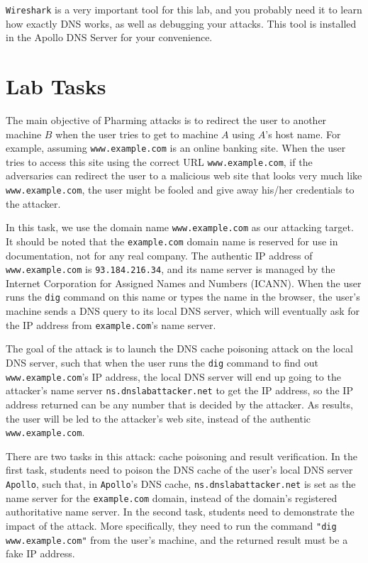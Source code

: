 {\tt Wireshark} is a very important tool for this lab, and you 
probably need it to learn how exactly DNS works, as well as 
debugging your attacks.  This tool is installed in the Apollo 
DNS Server for your convenience.


\section{Lab Tasks}


The main objective of Pharming attacks is to redirect the user
to another machine $B$ when the user tries to get to machine $A$ using
$A$'s host name. For example, assuming {\tt www.example.com} is an online banking 
site.  When the user tries to access this site using the
correct URL {\tt www.example.com}, if the adversaries can redirect the user 
to a malicious web site that looks very much like 
{\tt www.example.com}, the user might be fooled and give away 
his/her credentials to the attacker. 

In this task, we use the domain name {\tt www.example.com}
as our attacking target. It should be noted that the {\tt example.com} 
domain name is reserved for use in documentation, not for 
any real company. The authentic IP address of {\tt www.example.com} is 
{\tt 93.184.216.34}, and its name server is managed by
the Internet Corporation for Assigned Names and Numbers (ICANN).
When the user runs the {\tt dig} command 
on this name or types the name in the browser, 
the user's machine sends a DNS query to its local DNS 
server, which will eventually ask for the IP address 
from {\tt example.com}'s name server. 


The goal of the attack is to launch the DNS cache poisoning attack
on the local DNS server, such that 
when the user runs the {\tt dig} command to find out {\tt
www.example.com}'s IP address, the local DNS server will end
up going to the attacker's name server {\tt ns.dnslabattacker.net} 
to get the IP address, so the IP address returned can be 
any number that is decided by the attacker. As results, the 
user will be led to the attacker's web site,
instead of the authentic {\tt www.example.com}.



There are two tasks in this attack: cache poisoning and result
verification.  In the first task, 
students need to poison the DNS cache of the user's local DNS server {\tt
Apollo}, such that, in {\tt Apollo}'s DNS cache,
{\tt ns.dnslabattacker.net} is set as the name server for 
the {\tt example.com} domain, instead of the domain's 
registered authoritative name server. 
In the second task, students need to demonstrate the impact of the attack.
More specifically, they need to run the command {\tt "dig
www.example.com"} from the user's machine, and the returned 
result must be a fake IP address. 




